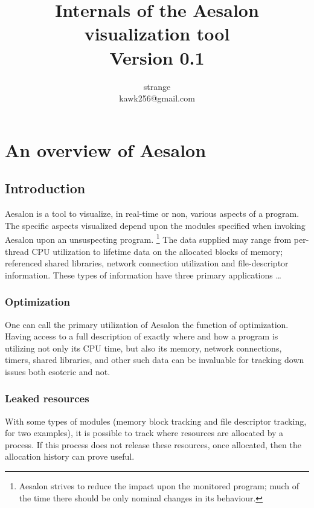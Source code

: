 \documentclass[a4paper,10pt]{report}
\author{strange\\kawk256@gmail.com}
\title{Internals of the Aesalon visualization tool\\\normalsize{Version 0.1}}
\begin{document}

\newcommand{\documentFunction}[4]{
  \emph{\textbf{#1 #2(}#3\textbf{)}} \\
    \par{
    \hangindent=2em
    \hangafter=0

    #4

  }
}

\maketitle

\tableofcontents

\setlength{\parindent}{10pt}
\setlength{\parskip}{1ex plus 0.5ex minus 0.2ex}


\chapter[Overview]{An overview of Aesalon}
\section{Introduction}
Aesalon is a tool to visualize, in real-time or non, various aspects of a program.
The specific aspects visualized depend upon the modules specified when invoking Aesalon
upon an unsuspecting program. \footnote{Aesalon strives to reduce the impact upon the
monitored program; much of the time there should be only nominal changes in its behaviour.}
The data supplied may range from per-thread CPU utilization to lifetime data on the allocated
blocks of memory; referenced shared libraries, network connection utilization and file-descriptor
information. These types of information have three primary applications \ldots

\subsection{Optimization}
One can call the primary utilization of Aesalon the function of optimization. Having access to a
full description of exactly where and how a program is utilizing not only its CPU time, but also
its memory, network connections, timers, shared libraries, and other such data can be invaluable
for tracking down issues both esoteric and not.

\subsection{Leaked resources}
With some types of modules (memory block tracking and file descriptor tracking, for two examples),
it is possible to track where resources are allocated by a process. If this process does not release
these resources, once allocated, then the allocation history can prove useful.
\end{document}
